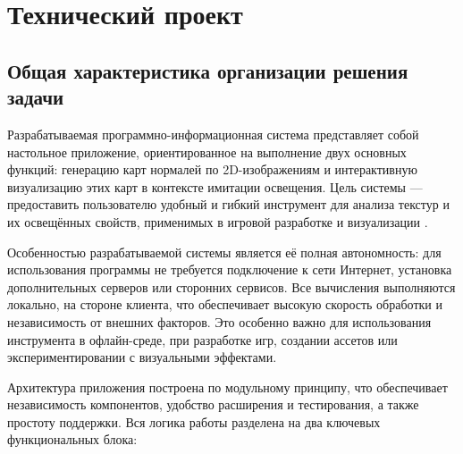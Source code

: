 \section{Технический проект}
\subsection{Общая характеристика организации решения задачи}

Разрабатываемая программно-информационная система представляет собой настольное приложение, ориентированное на выполнение двух основных функций: генерацию карт нормалей по 2D-изображениям и интерактивную визуализацию этих карт в контексте имитации освещения. Цель системы — предоставить пользователю удобный и гибкий инструмент для анализа текстур и их освещённых свойств, применимых в игровой разработке и визуализации \cite{tidwell2020}.

Особенностью разрабатываемой системы является её полная автономность: для использования программы не требуется подключение к сети Интернет, установка дополнительных серверов или сторонних сервисов. Все вычисления выполняются локально, на стороне клиента, что обеспечивает высокую скорость обработки и независимость от внешних факторов. Это особенно важно для использования инструмента в офлайн-среде, при разработке игр, создании ассетов или экспериментировании с визуальными эффектами.

Архитектура приложения построена по модульному принципу, что обеспечивает независимость компонентов, удобство расширения и тестирования, а также простоту поддержки. Вся логика работы разделена на два ключевых функциональных блока:

